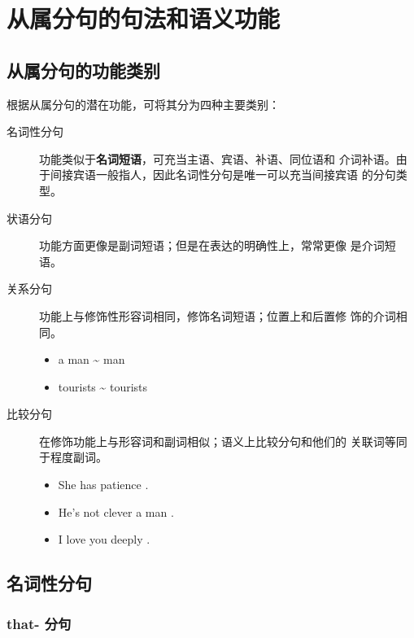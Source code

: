 \section{从属分句的句法和语义功能}

\subsection{从属分句的功能类别}

根据从属分句的潜在功能，可将其分为四种主要类别：
\begin{description}
\item[名词性分句] 功能类似于\textbf{名词短语}，可充当主语、宾语、补语、同位语和
  介词补语。由于间接宾语一般指人，因此名词性分句是唯一可以充当间接宾语
  的分句类型。

\item[状语分句] 功能方面更像是副词短语；但是在表达的明确性上，常常更像
  是介词短语。

\item[关系分句] 功能上与修饰性形容词相同，修饰名词短语；位置上和后置修
  饰的介词相同。
  \begin{itemize}
  \item a man  \~{}  man
  \item tourists  \~{} tourists 
  \end{itemize}

\item[比较分句] 在修饰功能上与形容词和副词相似；语义上比较分句和他们的
  关联词等同于程度副词。
  \begin{itemize}
  \item She has  patience .
  \item He's not  clever a man .
  \item I love you  deeply .
  \end{itemize}
\end{description}

\subsection{名词性分句}

\subsubsection{that- 分句}

